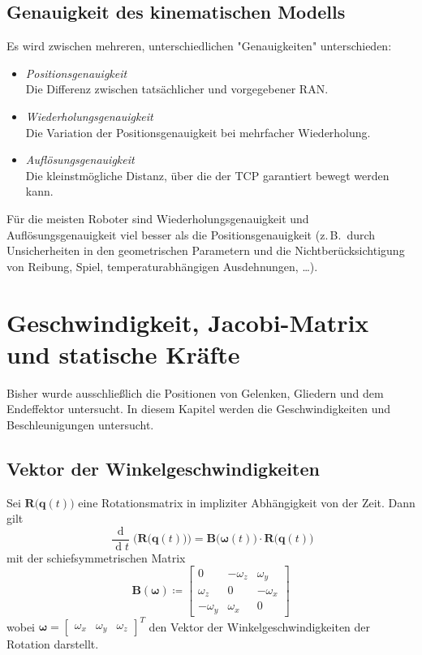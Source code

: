 \documentclass[a4paper, 11pt, accentcolor = tud3b]{tudreport}
\DeclareMathOperator{\total}{d}
\newcommand{\mat}[1]{\boldsymbol{#1}}
\renewcommand{\vec}[1]{\boldsymbol{\mathbf{#1}}}
\newcommand{\zB}{z.\,B.~}
\begin{document}
		\section{Genauigkeit des kinematischen Modells}
			Es wird zwischen mehreren, unterschiedlichen "Genauigkeiten" unterschieden:
			\begin{itemize}
				\item \emph{Positionsgenauigkeit} \\ Die Differenz zwischen tatsächlicher und vorgegebener RAN.
				\item \emph{Wiederholungsgenauigkeit} \\ Die Variation der Positionsgenauigkeit bei mehrfacher Wiederholung.
				\item \emph{Auflösungsgenauigkeit} \\ Die kleinstmögliche Distanz, über die der TCP garantiert bewegt werden kann.
			\end{itemize}
			Für die meisten Roboter sind Wiederholungsgenauigkeit und Auflösungsgenauigkeit viel besser als die Positionsgenauigkeit (\zB durch Unsicherheiten in den geometrischen Parametern und die Nichtberücksichtigung von Reibung, Spiel, temperaturabhängigen Ausdehnungen, \dots).

	\chapter{Geschwindigkeit, Jacobi-Matrix und statische Kräfte}
		Bisher wurde ausschließlich die Positionen von Gelenken, Gliedern und dem Endeffektor untersucht. In diesem Kapitel werden die Geschwindigkeiten und Beschleunigungen untersucht.

		\section{Vektor der Winkelgeschwindigkeiten}
			Sei \( \mat{R}\big(\!\vec{q}(t)\big) \) eine Rotationsmatrix in impliziter Abhängigkeit von der Zeit. Dann gilt
			\begin{equation*}
				\frac{\total}{\total t} \Big(\!\mat{R}\big(\vec{q}(t)\big)\Big) = \mat{B}\big(\!\vec{\omega}(t)\big) \cdot \mat{R}\big(\vec{q}(t)\big)
			\end{equation*}
			mit der schiefsymmetrischen Matrix
			\begin{equation*}
				\mat{B}(\vec{\omega}) \coloneqq
					\begin{bmatrix}
						0         & -\omega_z & \omega_y  \\
						\omega_z  & 0         & -\omega_x \\
						-\omega_y & \omega_x  & 0
					\end{bmatrix}
			\end{equation*}
			wobei \( \vec{\omega} = \begin{bmatrix} \omega_x & \omega_y & \omega_z \end{bmatrix}^T \) den Vektor der Winkelgeschwindigkeiten der Rotation darstellt.
			
\end{document}
